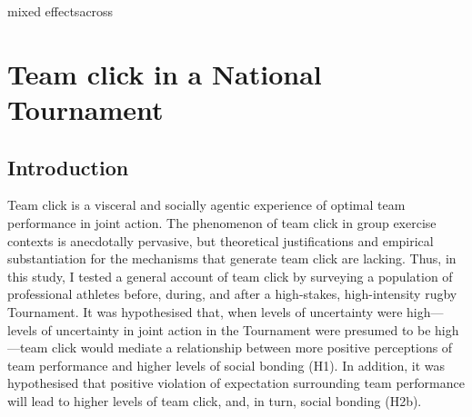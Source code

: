 mixed effectsacross
\begin{savequote}[8cm]

  \qauthor{}
\end{savequote}


\chapter{\label{chap:tournamentSurvey}Team click in a National Tournament}
                                            \begin{CJK}{UTF8}{gbsn}

\minitoc

\section{Introduction\label{sect:introSurvey}}
Team click is a visceral and socially agentic experience of optimal team performance in joint action.
The phenomenon of team click in group exercise contexts is anecdotally pervasive, but theoretical justifications and empirical substantiation for the mechanisms that generate team click are lacking.  Thus, in this study, I tested a general account of team click by surveying a population of professional athletes before, during, and after a high-stakes, high-intensity rugby Tournament.   It was hypothesised that, when levels of uncertainty were high---levels of uncertainty in joint action in the Tournament were presumed to be high---team click would mediate a relationship between more positive perceptions of team performance and higher levels of social bonding (H1).  In addition, it was hypothesised that positive violation of expectation surrounding team performance will lead to higher levels of team click, and, in turn, social bonding (H2b).


\end{CJK}
